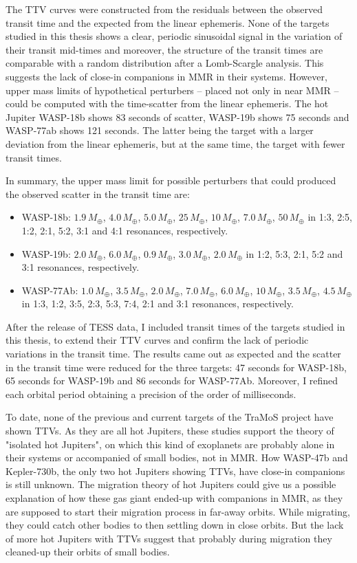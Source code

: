 The TTV curves were constructed from the residuals between the observed transit time and the expected from the linear ephemeris. None of the targets studied in this thesis shows a clear, periodic sinusoidal signal in the variation of their transit mid-times and moreover, the structure of the transit times are comparable with a random distribution after a Lomb-Scargle analysis. This suggests the lack of close-in companions in MMR in their systems. However, upper mass limits of hypothetical perturbers -- placed not only in near MMR -- could be computed with the time-scatter from the linear ephemeris. The hot Jupiter WASP-18b shows 83 seconds of scatter, WASP-19b shows 75 seconds and WASP-77ab shows 121 seconds. The latter being the target with a larger deviation from the linear ephemeris, but at the same time, the target with fewer transit times.

In summary, the upper mass limit for possible perturbers that could produced the observed scatter in the transit time are:
\begin{itemize}
\item WASP-18b: $1.9\,M_{\oplus}$, $4.0\,M_{\oplus}$, $5.0\,M_{\oplus}$, $25\,M_{\oplus}$, $10\,M_{\oplus}$, $7.0\,M_{\oplus}$, $50\,M_{\oplus}$ in 1:3, 2:5, 1:2, 2:1, 5:2, 3:1 and 4:1 resonances, respectively. 
\item WASP-19b: $2.0\,M_{\oplus}$, $6.0\,M_{\oplus}$, $0.9\,M_{\oplus}$, $3.0\,M_{\oplus}$, $2.0\,M_{\oplus}$ in 1:2, 5:3, 2:1, 5:2 and 3:1 resonances, respectively. 
\item WASP-77Ab: $1.0\,M_{\oplus}$, $3.5\,M_{\oplus}$, $2.0\,M_{\oplus}$, $7.0\,M_{\oplus}$, $6.0\,M_{\oplus}$, $10\,M_{\oplus}$, $3.5\,M_{\oplus}$, $4.5\,M_{\oplus}$ in 1:3, 1:2, 3:5, 2:3, 5:3, 7:4, 2:1 and 3:1 resonances, respectively.
\end{itemize}

After the release of TESS data, I included transit times of the targets studied in this thesis, to extend their TTV curves and confirm the lack of periodic variations in the transit time. The results came out as expected and the scatter in the transit time were reduced for the three targets: 47 seconds for WASP-18b, 65 seconds for WASP-19b and 86 seconds for WASP-77Ab. Moreover, I refined each orbital period obtaining a precision of the order of milliseconds. 

To date, none of the previous and current targets of the TraMoS project have shown TTVs. As they are all hot Jupiters, these studies support the theory of "isolated hot Jupiters", on which this kind of exoplanets are probably alone in their systems or accompanied of small bodies, not in MMR. How WASP-47b and Kepler-730b, the only two hot Jupiters showing TTVs, have close-in companions is still unknown. The migration theory of hot Jupiters could give us a possible explanation of how these gas giant ended-up with companions in MMR, as they are supposed to start their migration process in far-away orbits. While migrating, they could catch other bodies to then settling down in close orbits. But the lack of more hot Jupiters with TTVs suggest that probably during migration they cleaned-up their orbits of small bodies. 

